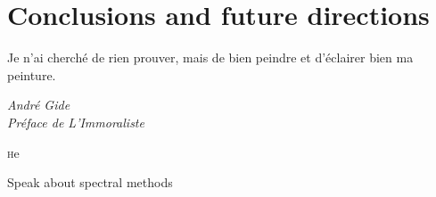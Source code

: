 \chapter*{Conclusions and future directions}

\epigraph{Je n’ai cherché de rien prouver, mais de bien peindre et d’éclairer bien ma peinture.}{\textit{André Gide \\ Préface de L'Immoraliste}}


\lettrine{\color{theme}{T}}he

Speak about spectral methods